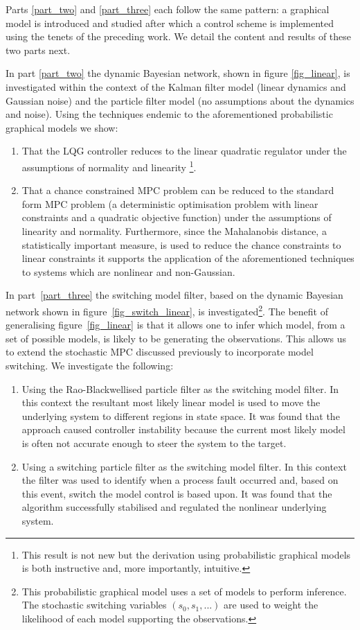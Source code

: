 Parts \ref{part_two} and \ref{part_three} each follow the same pattern: a graphical model is introduced and studied after which a control scheme is implemented using the tenets of the preceding work. We detail the content and results of these two parts next.

In part \ref{part_two} the dynamic Bayesian network, shown in figure \ref{fig_linear}, is investigated within the context of the Kalman filter model (linear dynamics and Gaussian noise) and the particle filter model (no assumptions about the dynamics and noise). Using the techniques endemic to the aforementioned probabilistic graphical models we show:
\begin{enumerate}
\item
That the LQG controller reduces to the linear quadratic regulator under the assumptions of normality and linearity \footnote{This result is not new but the derivation using probabilistic graphical models is both instructive and, more importantly, intuitive.}.
\item
That a chance constrained MPC problem can be reduced to the standard form MPC problem (a deterministic optimisation problem with linear constraints and a quadratic objective function) under the assumptions of linearity and normality. Furthermore, since the Mahalanobis distance, a statistically important measure, is used to reduce the chance constraints to linear constraints it supports the application of the aforementioned techniques to systems which are nonlinear and non-Gaussian. 
\end{enumerate}
In part~\ref{part_three} the switching model filter, based on the dynamic Bayesian network shown in figure~\ref{fig_switch_linear}, is investigated\footnote{This probabilistic graphical model uses a set of models to perform inference. The stochastic switching variables $(s_0, s_1,...)$ are used to weight the likelihood of each model supporting the observations.}. The benefit of generalising figure~\ref{fig_linear} is that it allows one to infer which model, from a set of possible models, is likely to be generating the observations. This allows us to extend the stochastic MPC discussed previously to incorporate model switching. We investigate the following:
\begin{enumerate}
\item
Using the Rao-Blackwellised particle filter as the switching model filter. In this context the resultant most likely linear model is used to move the underlying system to different regions in state space. It was found that the approach caused controller instability because the current most likely model is often not accurate enough to steer the system to the target.
\item
Using a switching particle filter as the switching model filter. In this context the filter was used to identify when a process fault occurred and, based on this event, switch the model control is based upon. It was found that the algorithm successfully stabilised and regulated the nonlinear underlying system.
\end{enumerate}

